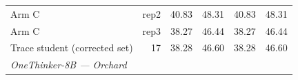 \begin{table}[t]
{\begin{tabular}{lrrrrr}
Arm C & rep2 & 40.83 & 48.31 & 40.83 & 48.31 \\
Arm C & rep3 & 38.27 & 46.44 & 38.27 & 46.44 \\
Trace student (corrected set) & 17 & 38.28 & 46.60 & 38.28 & 46.60 \\
\midrule
\multicolumn{6}{l}{\textit{OneThinker-8B --- Orchard}} \\

\end{tabular}}
\end{table}
